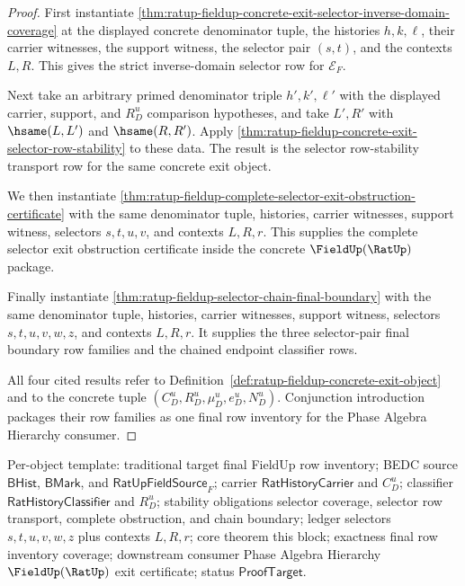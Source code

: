 \begin{proof}
First instantiate
\autoref{thm:ratup-fieldup-concrete-exit-selector-inverse-domain-coverage} at
the displayed concrete denominator tuple, the histories $h,k,\ell$, their
carrier witnesses, the support witness, the selector pair $(s,t)$, and the
contexts $L,R$. This gives the strict inverse-domain selector row for
$\mathcal E_F$.

Next take an arbitrary primed denominator triple $h',k',\ell'$ with the
displayed carrier, support, and $R_D^u$ comparison hypotheses, and take
$L',R'$ with $\hsame(L,L')$ and $\hsame(R,R')$. Apply
\autoref{thm:ratup-fieldup-concrete-exit-selector-row-stability} to these
data. The result is the selector row-stability transport row for the same
concrete exit object.

We then instantiate
\autoref{thm:ratup-fieldup-complete-selector-exit-obstruction-certificate} with
the same denominator tuple, histories, carrier witnesses, support witness,
selectors $s,t,u,v$, and contexts $L,R,r$. This supplies the complete selector
exit obstruction certificate inside the concrete $\FieldUp(\RatUp)$ package.

Finally instantiate \autoref{thm:ratup-fieldup-selector-chain-final-boundary}
with the same denominator tuple, histories, carrier witnesses, support witness,
selectors $s,t,u,v,w,z$, and contexts $L,R,r$. It supplies the three
selector-pair final boundary row families and the chained endpoint classifier
rows.

All four cited results refer to Definition~\ref{def:ratup-fieldup-concrete-exit-object}
and to the concrete tuple $(C_D^u,R_D^u,\mu_D^u,e_D^u,N_D^u)$. Conjunction
introduction packages their row families as one final row inventory for the
Phase Algebra Hierarchy consumer.
\end{proof}

Per-object template: traditional target final FieldUp row inventory; BEDC
source $\mathsf{BHist}$, $\mathsf{BMark}$, and
$\mathsf{RatUpFieldSource}_F$; carrier $\mathsf{RatHistoryCarrier}$ and
$C_D^u$; classifier $\mathsf{RatHistoryClassifier}$ and $R_D^u$; stability
obligations selector coverage, selector row transport, complete obstruction,
and chain boundary; ledger selectors $s,t,u,v,w,z$ plus contexts $L,R,r$; core
theorem this block; exactness final row inventory coverage; downstream consumer
Phase Algebra Hierarchy $\FieldUp(\RatUp)$ exit certificate; status
$\mathsf{ProofTarget}$.

